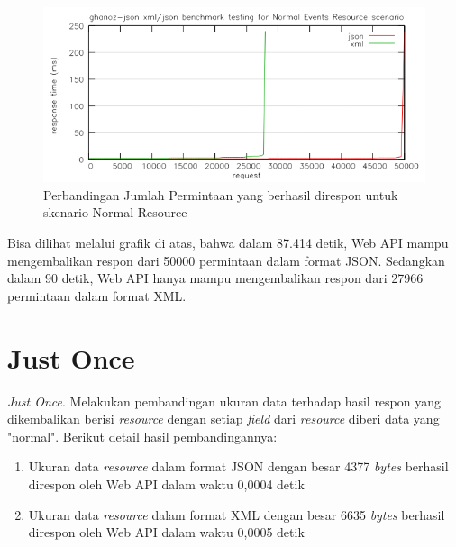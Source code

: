 \documentclass[a4paper, 12pt, oneside]{report}
\begin{document}
\begin{figure}[htp]
\centering
\includegraphics[scale=0.65]{images/benchmark-normal-resource.png}
\caption{Perbandingan Jumlah Permintaan yang berhasil direspon untuk skenario Normal Resource}
\label{benchmark-normal-resource}
\end{figure}

Bisa dilihat melalui grafik di atas, bahwa dalam 87.414 detik, Web API mampu mengembalikan respon dari 50000 permintaan dalam format JSON. Sedangkan dalam 90 detik, Web API hanya mampu mengembalikan respon dari 27966 permintaan dalam format XML.

\section{Just Once}

\onehalfspacing \textit{Just Once}. Melakukan pembandingan ukuran data terhadap hasil respon yang dikembalikan berisi \textit{resource} dengan setiap \textit{field} dari \textit{resource} diberi data yang "normal". Berikut detail hasil pembandingannya:

\begin{enumerate}
  \item Ukuran data \textit{resource} dalam format JSON dengan besar 4377 \textit{bytes} berhasil direspon oleh Web API dalam waktu 0,0004 detik
  \item Ukuran data \textit{resource} dalam format XML dengan besar 6635 \textit{bytes} berhasil direspon oleh Web API dalam waktu 0,0005 detik
\end{enumerate}
\end{document}

